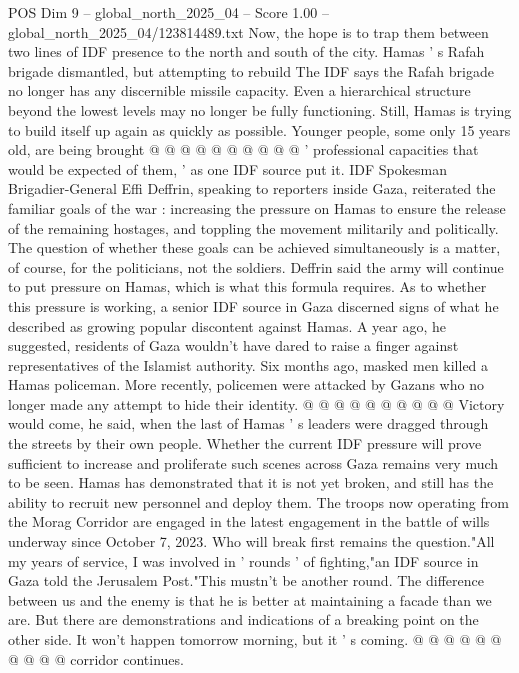 \begin{textsample}{POS Dim 9 – global\_north\_2025\_04 – Score 1.00 – global\_north\_2025\_04/123814489.txt}
Now, the hope is to trap them between two lines of IDF presence to the north and south of the city.
Hamas ' s Rafah brigade dismantled, but attempting to rebuild The IDF says the Rafah brigade no longer has any discernible missile capacity.
Even a hierarchical structure beyond the lowest levels may no longer be fully functioning.
Still, Hamas is trying to build itself up again as quickly as possible.
Younger people, some only 15 years old, are being brought @ @ @ @ @ @ @ @ @ @ ' professional capacities that would be expected of them, ' as one IDF source put it.
IDF Spokesman Brigadier-General Effi Deffrin, speaking to reporters inside Gaza, reiterated the familiar goals of the war : increasing the pressure on Hamas to ensure the release of the remaining hostages, and toppling the movement militarily and politically.
The question of whether these goals can be achieved simultaneously is a matter, of course, for the politicians, not the soldiers.
Deffrin said the army will continue to put pressure on Hamas, which is what this formula requires.
As to whether this pressure is working, a senior IDF source in Gaza discerned signs of what he described as growing popular discontent against Hamas.
A year ago, he suggested, residents of Gaza wouldn't have dared to raise a finger against representatives of the Islamist authority.
Six months ago, masked men killed a Hamas policeman.
More recently, policemen were attacked by Gazans who no longer made any attempt to hide their identity. @ @ @ @ @ @ @ @ @ @ Victory would come, he said, when the last of Hamas ' s leaders were dragged through the streets by their own people.
Whether the current IDF pressure will prove sufficient to increase and proliferate such scenes across Gaza remains very much to be seen.
Hamas has demonstrated that it is not yet broken, and still has the ability to recruit new personnel and deploy them.
The troops now operating from the Morag Corridor are engaged in the latest engagement in the battle of wills underway since October 7, 2023.
Who will break first remains the question."All my years of service, I was involved in ' rounds ' of fighting,"an IDF source in Gaza told the Jerusalem Post."This mustn't be another round.
The difference between us and the enemy is that he is better at maintaining a facade than we are.
But there are demonstrations and indications of a breaking point on the other side.
It won't happen tomorrow morning, but it ' s coming. @ @ @ @ @ @ @ @ @ @ corridor continues.

\end{textsample}
